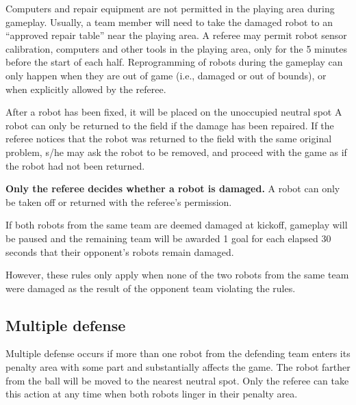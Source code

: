 \documentclass{article}
\begin{document}
Computers and repair equipment are not permitted in the playing area during
gameplay. Usually, a team member will need to take the damaged robot to an
``approved repair table'' near the playing area. A referee may permit robot
sensor calibration, computers and other tools in the playing area, only for the
5 minutes before the start of each half. Reprogramming of robots during the
gameplay can only happen when they are out of game (i.e., damaged or out of
bounds), or when explicitly allowed by the referee.

After a robot has been fixed, it will be placed on the unoccupied neutral spot
 A robot can only be returned to the field
if the damage has been repaired. If the referee notices that the robot was
returned to the field with the same original problem, s/he may ask the robot to
be removed, and proceed with the game as if the robot had not been returned.

\textbf{Only the referee decides whether a robot is damaged.} A robot can only
be taken off or returned with the referee's permission.

If both robots from the same team are deemed damaged at kickoff,
gameplay will be paused and the remaining team will be awarded 1 goal for
each elapsed 30 seconds that their opponent's robots remain damaged.

However, these rules only apply when none of the two robots from the same team
were damaged as the result of the opponent team violating the rules.


\subsection{Multiple defense \label{ref-013}}

Multiple defense occurs if more than one robot from the defending team enters
its penalty area with some part and substantially affects the game. The robot
farther from the ball will be moved to the nearest neutral spot.
Only the referee can take this action at any time when both
robots linger in their penalty area.
\end{document}
